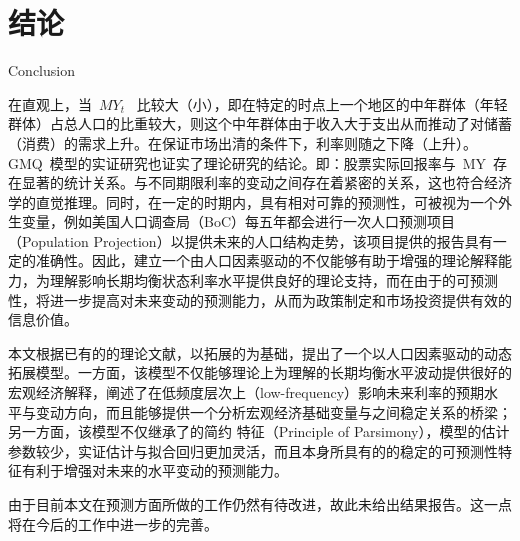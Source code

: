 
\chapter{结论}{Conclusion}
\label{chap06}

在直观上，当~$MY_t$~ 比较大（小），即在特定的时点上一个地区的中年群体（年轻群体）占总人口的比重较大，则这个中年群体由于收入大于支出从而推动了对储蓄（消费）的需求上升。在保证市场出清的条件下，利率则随之下降（上升）。GMQ~模型的实证研究也证实了理论研究的结论。即：股票实际回报率与~MY~存在显著的统计关系。\dsf 与不同期限利率的变动之间存在着紧密的关系，这也符合经济学的直觉推理。同时，在一定的时期内，\ds 具有相对可靠的预测性，可被视为一个外生变量，例如美国人口调查局（BoC）每五年都会进行一次人口预测项目（Population Projection）以提供未来的人口结构走势，该项目提供的报告具有一定的准确性。因此，建立一个由人口因素驱动的\tsm 不仅能够有助于增强\tsm 的理论解释能力，为理解影响长期均衡状态利率水平提供良好的理论支持，而在由于\dsf 的可预测性，将进一步提高对未来\tsm 变动的预测能力，从而为政策制定和市场投资提供有效的信息价值。

本文根据已有的\tsm 的理论文献，以拓展的\dns 为基础，提出了一个以人口因素驱动的动态\ts 拓展模型。一方面，该模型不仅能够理论上为理解\ts 的长期均衡水平波动提供很好的宏观经济解释，阐述了\dsf 在低频度层次上（low-frequency）影响未来利率的预期水平与变动方向，而且能够提供一个分析宏观经济基础变量与\ts 之间稳定关系的桥梁；另一方面，该模型不仅继承了\dns 的简约 特征（Principle of Parsimony），模型的估计参数较少，实证估计与拟合回归更加灵活，而且\dsf 本身所具有的的稳定的可预测性特征有利于增强对未来\ts 的水平变动的预测能力。

由于目前本文在\ts 预测方面所做的工作仍然有待改进，故此未给出结果报告。这一点将在今后的工作中进一步的完善。
